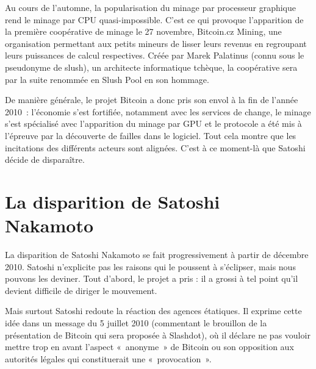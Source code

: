 Au cours de l'automne, la popularisation du minage par processeur graphique rend le minage par CPU quasi-impossible. C'est ce qui provoque l'apparition de la première coopérative de minage le 27 novembre, Bitcoin.cz Mining, une organisation permettant aux petits mineurs de lisser leurs revenus en regroupant leurs puissances de calcul respectives. Créée par Marek Palatinus (connu sous le pseudonyme de slush), un architecte informatique tchèque, la coopérative sera par la suite renommée en Slush Pool en son hommage.

De manière générale, le projet Bitcoin a donc pris son envol à la fin de l'année 2010~: l'économie s'est fortifiée, notamment avec les services de change, le minage s'est spécialisé avec l'apparition du minage par GPU et le protocole a été mis à l'épreuve par la découverte de failles dans le logiciel. Tout cela montre que les incitations des différents acteurs sont alignées. C'est à ce moment-là que Satoshi décide de disparaître.

\section*{La disparition de Satoshi Nakamoto}

La disparition de Satoshi Nakamoto se fait progressivement à partir de décembre 2010. Satoshi n'explicite pas les raisons qui le poussent à s'éclipser, mais nous pouvons les deviner. Tout d'abord, le projet a pris : il a grossi à tel point qu'il devient difficile de diriger le mouvement.

Mais surtout Satoshi redoute la réaction des agences étatiques. Il exprime cette idée dans un message du 5 juillet 2010 (commentant le brouillon de la présentation de Bitcoin qui sera proposée à Slashdot), où il déclare ne pas vouloir mettre trop en avant l'aspect «~anonyme~» de Bitcoin ou son opposition aux autorités légales qui constituerait une «~provocation~».


